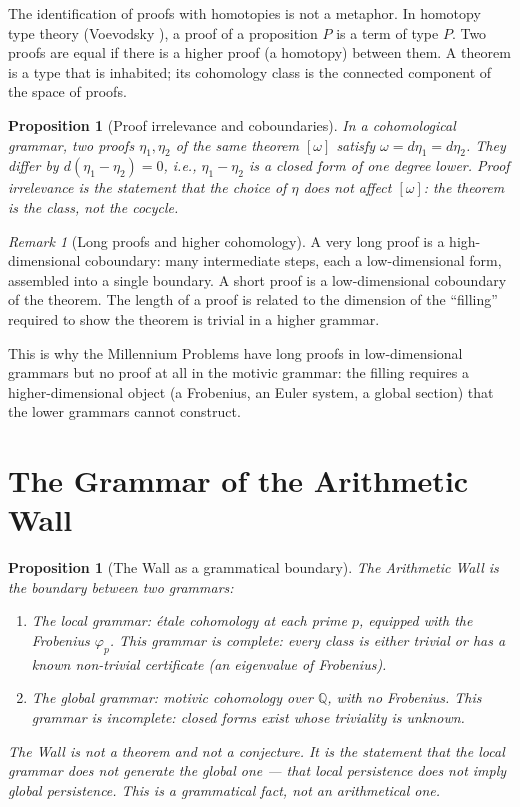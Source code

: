 \documentclass[12pt]{article}
\newtheorem{proposition}[theorem]{Proposition}
\theoremstyle{definition}
\theoremstyle{remark}
\newtheorem{remark}[theorem]{Remark}
\begin{document}
The identification of proofs with homotopies is not a metaphor.
In homotopy type theory (Voevodsky \cite{voevodsky2013}),
a proof of a proposition $P$ is a term of type $P$.
Two proofs are equal if there is a higher proof (a homotopy) between them.
A theorem is a type that is inhabited; its cohomology class
is the connected component of the space of proofs.

\begin{proposition}[Proof irrelevance and coboundaries]
In a cohomological grammar, two proofs $\eta_1, \eta_2$ of the same
theorem $[\omega]$ satisfy $\omega = d\eta_1 = d\eta_2$.
They differ by $d(\eta_1 - \eta_2) = 0$, i.e., $\eta_1 - \eta_2$ is a
closed form of one degree lower.
\emph{Proof irrelevance} is the statement that the choice of $\eta$
does not affect $[\omega]$: the theorem is the class, not the cocycle.
\end{proposition}

\begin{remark}[Long proofs and higher cohomology]
A very long proof is a high-dimensional coboundary: many intermediate
steps, each a low-dimensional form, assembled into a single boundary.
A short proof is a low-dimensional coboundary of the theorem.
The length of a proof is related to the dimension of the ``filling''
required to show the theorem is trivial in a higher grammar.

This is why the Millennium Problems have long proofs in low-dimensional
grammars but no proof at all in the motivic grammar: the filling
requires a higher-dimensional object (a Frobenius, an Euler system,
a global section) that the lower grammars cannot construct.
\end{remark}

\section{The Grammar of the Arithmetic Wall}

\begin{proposition}[The Wall as a grammatical boundary]
The Arithmetic Wall \cite{synthesis} is the boundary between two grammars:
\begin{enumerate}
\item The \emph{local grammar}: étale cohomology at each prime $p$,
  equipped with the Frobenius $\varphi_p$. This grammar is complete:
  every class is either trivial or has a known non-trivial certificate
  (an eigenvalue of Frobenius).
\item The \emph{global grammar}: motivic cohomology over $\mathbb{Q}$,
  with no Frobenius. This grammar is incomplete:
  closed forms exist whose triviality is unknown.
\end{enumerate}
The Wall is not a theorem and not a conjecture.
It is the statement that the local grammar does not generate the global one ---
that local persistence does not imply global persistence.
This is a grammatical fact, not an arithmetical one.
\end{proposition}
\end{document}
